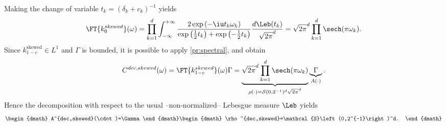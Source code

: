 Making the change of variable $t_k=(\delta_k+c_k)^{-1}$ yields
\begin{dmath*}
    \FT{k_0^{skewed}}(\omega)
    = \prod_{k=1}^d\int_{-\infty}^{+\infty} \frac{2 \exp\left(-\iu t_k
    \omega_k\right)}{\exp\left(\frac{1}{2} t_k \right) + \exp\left(-\frac{1}{2}
    t_k \right)} \frac{d\Leb(t_k)}{\sqrt{2\pi}^d}
    =\sqrt{2\pi}^d\prod_{k=1}^d\sech(\pi\omega_k).
\end{dmath*}
Since $k^{\text{skewed}}_{1-c}\in L^1$ and $\Gamma$ is bounded, it is possible
to apply \cref{pr:spectral}, and obtain
\begin{dmath*}
    C^{dec,skewed}(\omega)
    =\FT{k_{1-c}^{skewed}}(\omega)\Gamma
    =\underbrace{\sqrt{2\pi}^d\prod_{k=1}^d\sech(\pi \omega_k)}_{\rho(\cdot) =
    \mathcal{S}(0, 2^{-1})^d\sqrt{2 \pi}^d}\underbrace{\Gamma}_{A(\cdot)}.
\end{dmath*}
Hence the decomposition with respect to the usual --non-normalized-- Lebesgue
measure $\Leb$ yields
\begin{dgroup}
    \begin{dmath}
        A^{dec,skewed}(\cdot)=\Gamma
    \end{dmath}
    \begin{dmath}
        \rho^{dec,skewed}=\mathcal{S}\left(0,2^{-1}\right)^d.
    \end{dmath}
\end{dgroup}

